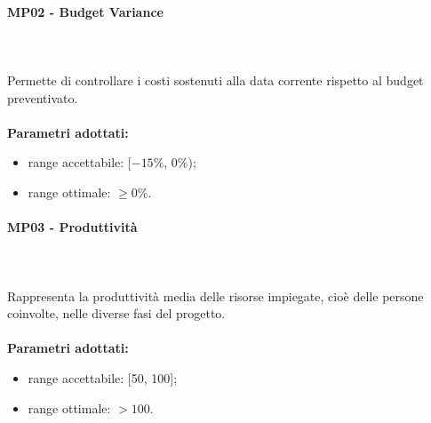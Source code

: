 \paragraph{MP02 - Budget Variance} \mbox{} \\ \mbox{} \\
Permette di controllare i costi sostenuti alla data corrente rispetto al budget preventivato. \\ \\ 
\textbf{Parametri adottati:}  
\begin{itemize}
\item range accettabile: [$-15\%$, $0\%$); 
\item range ottimale: $ \geq 0\%$.
\end{itemize}

\paragraph{MP03 - Produttività} \mbox{} \\ \mbox{} \\
Rappresenta la produttività media delle risorse impiegate, cioè delle persone coinvolte, nelle diverse fasi del progetto. \\ \\ 
\textbf{Parametri adottati:} 
\begin{itemize}
	\item range accettabile: [50, 100];
	\item range ottimale: $ > 100$.
\end{itemize}


